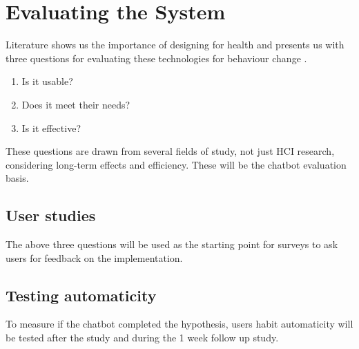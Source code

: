 
\newpage
\section{Evaluating the System}

Literature shows us the importance of designing for health and presents us with three questions for evaluating these technologies for behaviour change \cite{article_designing_for_health_behaviour_change_hci}.
\begin{enumerate}
\item Is it usable?
\item Does it meet their needs?
\item Is it effective?
\end{enumerate}
These questions are drawn from several fields of study, not just HCI research, considering long-term effects and efficiency. These will be the chatbot evaluation basis.

\subsection{User studies}
The above three questions will be used as the starting point for surveys to ask users for feedback on the implementation.

\subsection{Testing automaticity}
To measure if the chatbot completed the hypothesis, users habit automaticity will be tested after the study and during the 1 week follow up study.
